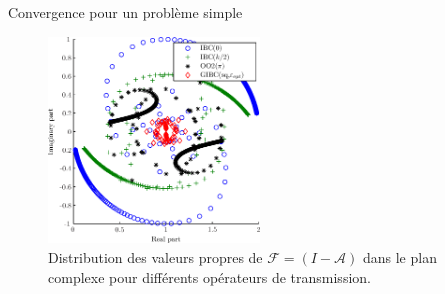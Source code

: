 \documentclass[
mode=present,    %
paper=a4paper,   %
orient=landscape,
display=slides,   %
size=10pt,
style=romain   %
]{powerdot}
\begin{document}
\begin{slide}[toc=]{Convergence pour un problème simple}

\begin{figure}
  \begin{center}
    \includegraphics[width=0.5\textwidth]{SpectrumIBCGIBC-final}
  \end{center}
  \caption{Distribution des valeurs propres de $\mathcal{F}=(I-\mathcal{A})$ dans le plan complexe
     pour différents opérateurs de transmission.}
  \label{spectrum}
\end{figure}

\end{slide}



\end{document}
